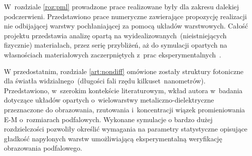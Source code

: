 W~rozdziale \ref{roz:pml} prowadzone prace realizowane były dla zakresu dalekiej podczerwieni. Przedstawiono prace numeryczne zawierające propozycję realizacji nie odbijającej warstwy pochłaniającej za pomocą układów warstwowych. Całość projektu przedstawia analizę opartą na wyidealizowanych~(nieistniejących fizycznie) materiałach, przez serię przybliżeń, aż do symulacji opartych na własnościach materiałowych zaczerpniętych z~prac eksperymentalnych~\cite{ania2015,stefaniuk2015perfectly}.

W przedostatnim,  rozdziale \ref{art:nondiff}  omówione zostały struktury fotoniczne dla światła widzialnego~(długości fali rzędu kilkuset~nanometrów). Przedstawiono, w~szerokim kontekście literaturowym, wkład autora w~badania dotyczące układów opartych o~wielowarstwy metaliczno-dielektryczne przeznaczone do obrazowania, rzutowania i~koncentracji wiązek promieniowania E-M o~rozmiarach podfalowych. Wykonane symulacje o bardzo dużej rozdzielczości pozwoliły określić wymagania na parametry statystyczne opisujące gładkość napylonych warstw umożliwiającą eksperymentalną weryfikację obrazowania podfalowego.

